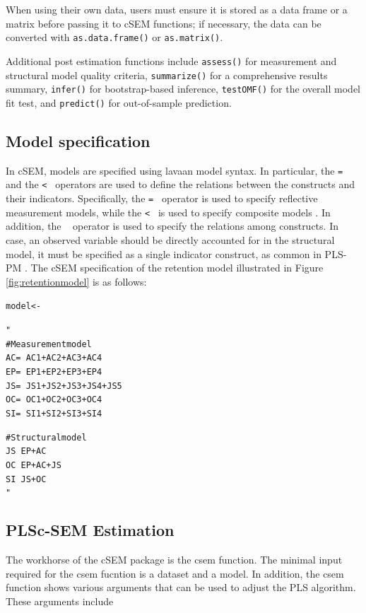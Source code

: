 \documentclass[12pt,a4paper]{article}\usepackage[]{graphicx}\usepackage[]{xcolor}
\makeatletter
\newcommand{\hlsng}[1]{\textcolor[rgb]{0.192,0.494,0.8}{#1}}%
\newcommand{\hldef}[1]{\textcolor[rgb]{0.345,0.345,0.345}{#1}}%
\newcommand{\hlkwb}[1]{\textcolor[rgb]{0.69,0.353,0.396}{#1}}%
\newenvironment{kframe}{%
 \def\at@end@of@kframe{}%
 \ifinner\ifhmode%
  \def\at@end@of@kframe{\end{minipage}}%
  \begin{minipage}{\columnwidth}%
 \fi\fi%
 \def\FrameCommand##1{\hskip\@totalleftmargin \hskip-\fboxsep
 \colorbox{shadecolor}{##1}\hskip-\fboxsep
     \hskip-\linewidth \hskip-\@totalleftmargin \hskip\columnwidth}%
 \MakeFramed {\advance\hsize-\width
   \@totalleftmargin\z@ \linewidth\hsize
   \@setminipage}}%
 {\par\unskip\endMakeFramed%
 \at@end@of@kframe}
\newenvironment{knitrout}{}{} %
\newcommand{\pkg}[1]{\textsf{#1}}
\newcommand{\fn}[1]{\texttt{#1}}   %
\makeatother
\begin{document}
When using their own data, users must ensure it is stored as a data frame or a matrix before passing it to \pkg{cSEM} functions; if necessary, the data can be converted with \fn{as.data.frame()} or \fn{as.matrix()}.

Additional post estimation functions include \fn{assess()} for measurement and structural model quality criteria, \fn{summarize()} for a comprehensive results summary, \fn{infer()} for bootstrap-based inference, \fn{testOMF()} for the overall model fit test, and \fn{predict()} for out-of-sample prediction.


\subsection{Model specification}
In \pkg{cSEM}, models are specified using \pkg{lavaan} model syntax.
In particular, the \texttt{=~} and the \texttt{<~} operators are used to define the relations between the constructs and their indicators.
Specifically, the \texttt{=~} operator is used to specify reflective measurement models, while the \texttt{<~} is used to specify composite models \citep[see][for an explanation of reflective and composite models]{}.
In addition, the \texttt{~} operator is used to specify the relations among constructs.
In case, an observed variable should be directly accounted for in the structural model, it must be specified as a single indicator construct, as common in PLS-PM \citep{}.
The \pkg{cSEM} specification of the retention model illustrated in Figure \ref{fig:retentionmodel} is as follows:

\begin{knitrout}\small
{}\color{fgcolor}\begin{kframe}
\begin{alltt}
\hldef{model} \hlkwb{<-} \hlsng{"
  # Measurement model
  AC =~ AC1 + AC2 + AC3 + AC4
  EP =~ EP1 + EP2 + EP3 + EP4
  JS =~ JS1 + JS2 + JS3 + JS4 + JS5
  OC =~ OC1 + OC2 + OC3 + OC4
  SI =~ SI1 + SI2 + SI3 + SI4

  # Structural model
  JS ~ EP + AC
  OC ~ EP + AC + JS
  SI ~ JS + OC
"}
\end{alltt}
\end{kframe}
\end{knitrout}



\subsection{PLSc-SEM Estimation}
The workhorse of the \pkg{cSEM} package is the csem function.
The minimal input required for the csem fucntion is a dataset and a model.
In addition, the csem function shows various arguments that can be used to adjust the PLS algorithm.
These arguments include
\end{document}
